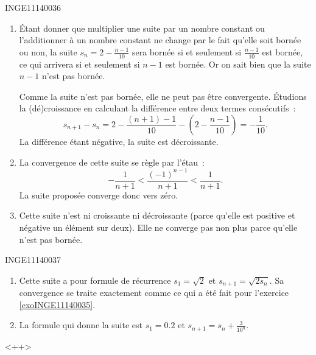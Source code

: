 \documentclass{article}
\begin{document}
\begin{corrige}{INGE11140036}

	\begin{enumerate}

		\item

			Étant donner que multiplier une suite par un nombre constant ou l'additionner à un nombre constant ne change par le fait qu'elle soit bornée ou non, la suite $s_n=2-\frac{ n-1 }{ 10 }$ sera bornée si et seulement si $\frac{ n-1 }{ 10 }$ est bornée, ce qui arrivera si et seulement si $n-1$ est bornée. Or on sait bien que la suite $n-1$ n'est pas bornée.

			Comme la suite n'est pas bornée, elle ne peut pas être convergente. Étudions la (dé)croissance en calculant la différence entre deux termes consécutifs~:
			\begin{equation}
				s_{n+1}-s_n=2-\frac{ (n+1)-1 }{ 10 }-\left( 2-\frac{ n-1 }{ 10 } \right)=-\frac{ 1 }{ 10 }.
			\end{equation}
			La différence étant négative, la suite est décroissante.

		\item
			La convergence de cette suite se règle par l'étau~:
			\begin{equation}
				-\frac{ 1 }{ n+1 }<\frac{ (-1)^{n-1} }{ n+1 }<\frac{ 1 }{ n+1 }.
			\end{equation}
			La suite proposée converge donc vers zéro.

		\item
			Cette suite n'est ni croissante ni décroissante (parce qu'elle est positive et négative un élément sur deux). Elle ne converge pas non plus parce qu'elle n'est pas bornée.

	\end{enumerate}

\end{corrige}


\begin{corrige}{INGE11140037}

	\begin{enumerate}

		\item
			Cette suite a pour formule de récurrence $s_1=\sqrt{2}$ et $s_{n+1}=\sqrt{2s_{n}}$. Sa convergence se traite exactement comme ce qui a été fait pour l'exercice \ref{exoINGE11140035}.

		\item
			La formule qui donne la suite est $s_1=0.2$ et $s_{n+1}=s_n+\frac{ 3 }{ 10^n }$.

	\end{enumerate}
	<++>

\end{corrige}
\end{document}
